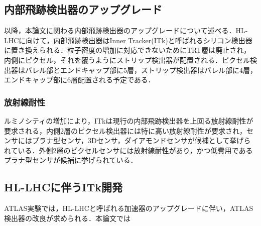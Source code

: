 \subsection{内部飛跡検出器のアップグレード}
以降，本論文に関わる内部飛跡検出器のアップグレードについて述べる．HL-LHCに向けて，内部飛跡検出器はInner Tracker(ITk)と呼ばれるシリコン検出器に置き換えられる．粒子密度の増加に対応できないためにTRT層は廃止され，内側にピクセル，それを覆うようにストリップ検出器が配置される．ピクセル検出器はバレル部とエンドキャップ部に5層，ストリップ検出器はバレル部に4層，エンドキャップ部に6層配置される予定である．

\subsubsection*{放射線耐性}       
ルミノシティの増加により，ITkは現行の内部飛跡検出器を上回る放射線耐性が要求される，内側2層のピクセル検出器には特に高い放射線耐性が要求され，センサにはプラナ型センサ，3Dセンサ，ダイアモンドセンサが候補として挙げられている．外側2層のピクセルセンサには放射線耐性があり，かつ低費用であるプラナ型センサが候補に挙げられている．

\subsubsection*{}

\subsection{HL-LHCに伴うITk開発}
ATLAS実験では，HL-LHCと呼ばれる加速器のアップグレードに伴い，ATLAS検出器の改良が求められる．本論文では
